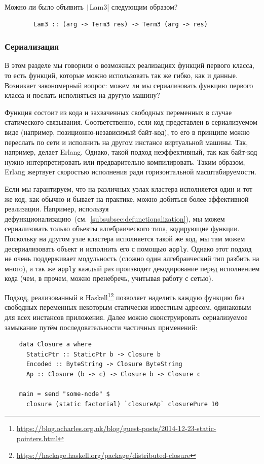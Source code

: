\begin{task}
    Можно ли было объявить \texttt|Lam3| следующим образом?
    \begin{verbatim}
        Lam3 :: (arg -> Term3 res) -> Term3 (arg -> res)
    \end{verbatim}
\end{task}

\subsubsection{Сериализация}

В этом разделе мы говорили о возможных реализациях функций первого класса, то есть функций, которые можно использовать так же гибко, как и данные.
Возникает закономерный вопрос: можем ли мы сериализовать функцию первого класса и послать исполняться на другую машину?

Функция состоит из кода и захваченных свободных переменных в случае статического связывания.
Соответственно, если код представлен в сериализуемом виде (например, позиционно-независимый байт-код), то его в принципе можно переслать по сети и исполнить на другом инстансе виртуальной машины.
Так, например, делает Erlang.
Однако, такой подход неэффективный, так как байт-код нужно интерпретировать или предварительно компилировать.
Таким образом, Erlang жертвует скоростью исполнения ради горизонтальной масштабируемости.

Если мы гарантируем, что на различных узлах кластера исполняется один и тот же код, как обычно и бывает на практике, можно добиться более эффективной реализации.
Например, используя дефункционализацию~(см.~\ref{subsubsec:defunctionalization}), мы можем сериализовать только объекты алгебраического типа, кодирующие функции.
Поскольку на другом узле кластера исполняется такой же код, мы там можем десериализовать объект и исполнить его с помощью \texttt{apply}.
Однако этот подход не очень поддерживает модульность (сложно один алгебраический тип разбить на много), а так же \texttt{apply} каждый раз производит декодирование перед исполнением кода (чем, в прочем, можно пренебречь, учитывая работу с сетью).

Подход, реализованный в Haskell\footnote{\url{https://blog.ocharles.org.uk/blog/guest-posts/2014-12-23-static-pointers.html}}\footnote{\url{https://hackage.haskell.org/package/distributed-closure}} позволяет наделить каждую функцию без свободных переменных некоторым статически известным адресом, одинаковым для всех инстансов приложения.
Далее можно сконструировать сериализуемое замыкание путём последовательности частичных применений:
\begin{verbatim}
    data Closure a where
      StaticPtr :: StaticPtr b -> Closure b
      Encoded :: ByteString -> Closure ByteString
      Ap :: Closure (b -> c) -> Closure b -> Closure c

    main = send "some-node" $
      closure (static factorial) `closureAp` closurePure 10
\end{verbatim}

